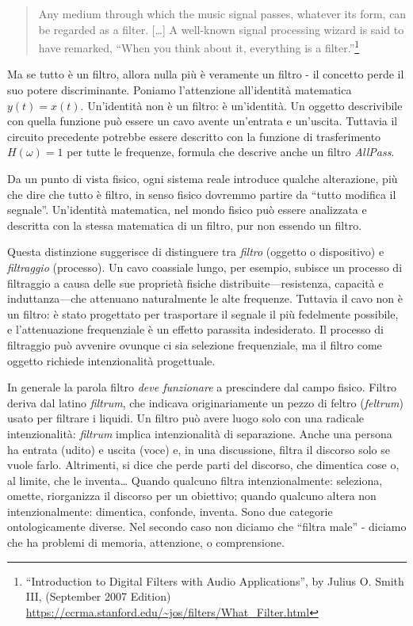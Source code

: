 \begin{quote}
  \begin{sf}
    \small
    Any medium through which the music signal passes, whatever its form, can be
    regarded as a filter. [\ldots] A well-known signal processing wizard is said
    to have remarked, “When you think about it, everything is a filter.”\footnote{
    “Introduction to Digital Filters with Audio Applications”, by Julius O.
    Smith III, (September 2007 Edition)
    \url{https://ccrma.stanford.edu/~jos/filters/What_Filter.html}
    }
  \end{sf}
\end{quote}

Ma se tutto è un filtro, allora nulla più è veramente un filtro - il concetto
perde il suo potere discriminante. Poniamo l'attenzione all'identità matematica
$y(t)=x(t)$. Un'identità non è un filtro: è un'identità. Un oggetto descrivibile
con quella funzione può essere un cavo avente un'entrata e un'uscita. Tuttavia
il circuito precedente potrebbe essere descritto con la funzione di
trasferimento $H(\omega)=1$ per tutte le frequenze, formula che descrive anche
un filtro \emph{AllPass}.

Da un punto di vista fisico, ogni sistema reale introduce qualche alterazione,
più che dire che tutto è filtro, in senso fisico dovremmo partire da “tutto
modifica il segnale”. Un'identità matematica, nel mondo fisico può essere
analizzata e descritta con la stessa matematica di un filtro, pur non essendo un
filtro.

Questa distinzione suggerisce di distinguere tra \emph{filtro} (oggetto o
dispositivo) e \emph{filtraggio} (processo). Un cavo coassiale lungo, per
esempio, subisce un processo di filtraggio a causa delle sue proprietà fisiche
distribuite—resistenza, capacità e induttanza—che attenuano naturalmente le
alte frequenze. Tuttavia il cavo non è un filtro: è stato progettato per
trasportare il segnale il più fedelmente possibile, e l'attenuazione
frequenziale è un effetto parassita indesiderato. Il processo di filtraggio
può avvenire ovunque ci sia selezione frequenziale, ma il filtro come oggetto
richiede intenzionalità progettuale.

In generale la parola filtro \emph{deve funzionare} a prescindere dal campo
fisico. Filtro deriva dal latino \emph{filtrum}, che indicava originariamente un
pezzo di feltro (\emph{feltrum}) usato per filtrare i liquidi. Un filtro può
avere luogo solo con una radicale intenzionalità: \emph{filtrum} implica
intenzionalità di separazione. Anche una persona ha entrata (udito) e uscita
(voce) e, in una discussione, filtra il discorso solo se vuole farlo. Altrimenti,
si dice che perde parti del discorso, che dimentica cose o, al limite, che le inventa\ldots
Quando qualcuno filtra intenzionalmente: seleziona, omette, riorganizza il
discorso per un obiettivo; quando qualcuno altera non intenzionalmente:
dimentica, confonde, inventa. Sono due categorie ontologicamente diverse. Nel
secondo caso non diciamo che “filtra male” - diciamo che ha problemi di memoria,
attenzione, o comprensione.

